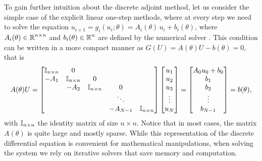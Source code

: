 To gain further intuition about the discrete adjoint method, let us consider the simple case of the explicit linear one-step methods, where at every step we need to solve the equation $u_{i+1} = g_i (u_i; \theta) = A_i (\theta) \, u_i + b_i(\theta)$, where $A_i(\theta) \in \operatorname{\mathbb{R}}^{n \times n}$ and $b_i(\theta) \in \operatorname{\mathbb{R}}^n$ are defined by the numerical solver \cite{Johnson}. 
This condition can be written in a more compact manner as $G(U)=A(\theta) U - b(\theta) = 0$, that is 
\begin{equation}
    A(\theta) U 
    = 
    \begin{bmatrix}
        \operatorname{\mathbb{I}}_{n \times n} & 0 &   &  & \\
        -A_1 & \operatorname{\mathbb{I}}_{n \times n} & 0 &  &  \\
          & -A_2 & \operatorname{\mathbb{I}}_{n \times n} & 0 &  \\
         &  &   & \ddots &   \\
         &  &  & -A_{N-1} & \operatorname{\mathbb{I}}_{n \times n}
    \end{bmatrix}
    \begin{bmatrix}
        u_1 \\
        u_2 \\
        u_3 \\
        \vdots \\
        u_N
    \end{bmatrix}
    = 
    \begin{bmatrix}
        A_0 u_0 + b_0 \\
        b_1 \\
        b_2 \\
        \vdots \\
        b_{N-1}
    \end{bmatrix}
    = 
    b(\theta), 
\end{equation}
with $\operatorname{\mathbb{I}}_{n \times n}$ the identity matrix of size $n \times n$.
Notice that in most cases, the matrix $A(\theta)$ is quite large and mostly sparse. 
While this representation of the discrete differential equation is  convenient for mathematical manipulations, when solving the system we rely on iterative solvers that save memory and computation. 

